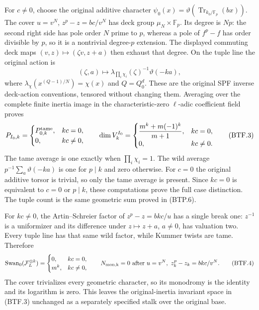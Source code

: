 For \(c\ne0\), choose the original additive character
\(\psi_0(x)=\vartheta(\operatorname{Tr}_{k_0/\mathbb F_p}(bx))\).
The cover \(u=v^N\), \(z^p-z=bc/v^N\) has deck
group \(\mu_N\times\mathbb F_p\).  Its degree is
\(Np\): the second right side has pole order \(N\)
prime to \(p\), whereas a pole of \(f^p-f\) has order
divisible by \(p\), so it is a nontrivial degree-\(p\)
extension.  The displayed commuting deck maps
\((v,z)\mapsto(\zeta v,z+a)\) then exhaust that degree.
On the tuple line the original action is
\[
 (\zeta,a)\longmapsto
   \lambda_{\prod_i\chi_i}(\zeta)^{-1}\vartheta(-ka),
\tag{BTF.2}\label{eq:btf2}
\]
where \(\lambda_\chi(x^{(Q-1)/N})=\chi(x)\) and
\(Q=Q_0^d\).  These are the original SPF inverse
deck-action conventions, tensored without changing
them.  Averaging over the complete finite inertia
image in the characteristic-zero \(\ell\)-adic
coefficient field proves
\[
 P_{I_0,k}=
 \begin{cases}P^{\rm tame}_{0,k},&kc=0,\\
 0,&kc\ne0,
 \end{cases}
 \qquad
 \dim V_k^{I_0}=
 \begin{cases}\dfrac{m^k+m(-1)^k}{m+1},&kc=0,\\
 0,&kc\ne0.
 \end{cases}
\tag{BTF.3}\label{eq:btf3}
\]
The tame average is one exactly when \(\prod_i\chi_i=1\).
The wild average \(p^{-1}\sum_a\vartheta(-ka)\) is one
for \(p\mid k\) and zero otherwise.  For \(c=0\) the
original additive torsor is trivial, so only the tame
average is present.  Since \(kc=0\) is equivalent to
\(c=0\) or \(p\mid k\), these computations prove
the full case distinction.  The tuple count is the
same geometric sum proved in (BTP.6).

For \(kc\ne0\), the Artin--Schreier factor of
\(z^p-z=bkc/u\) has a single break one: \(z^{-1}\)
is a uniformizer and its difference under
\(z\mapsto z+a\), \(a\ne0\), has valuation two.
Every tuple line has that same wild factor, while
Kummer twists are tame.  Therefore
\[
 \operatorname{Swan}_0(\mathcal F_L^{\otimes k})
   =\begin{cases}0,&kc=0,\\m^k,&kc\ne0,\end{cases}
 \qquad N_{\rm mon,k}=0
   \ \text{after }u=v^N,\ z_k^p-z_k=bkc/v^N.
\tag{BTF.4}\label{eq:btf4}
\]
The cover trivializes every geometric character, so
its monodromy is the identity and its logarithm is
zero.  This leaves the original-inertia invariant
space in (BTF.3) unchanged as a separately specified
stalk over the original base.

